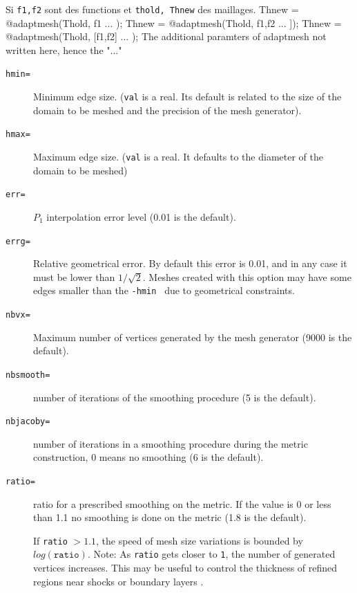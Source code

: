 \documentclass[a4paper,twoside,12pt]{book}
\begin{document}
Si \texttt{f1,f2} sont des functions  et \texttt{thold, Thnew} des maillages.
\bFF
    Thnew = @adaptmesh(Thold, f1  ...  );
    Thnew = @adaptmesh(Thold, f1,f2  ...  ]);
    Thnew = @adaptmesh(Thold, [f1,f2]  ...  );
\eFF
The additional paramters of  adaptmesh not written here, hence the  "..."
\begin{description}

\item[\texttt{hmin=}] Minimum edge size.   ({\tt val} is a real. Its default is related to the
size of the domain to be meshed and the precision of the mesh generator).

\item[\texttt{hmax=}] Maximum edge size.  ({\tt val} is a real.  It defaults to the diameter of the domain to be meshed)

\item[\texttt{err=}] $P_1$ interpolation error level (0.01 is the default).  

\item[\texttt{errg=}] Relative geometrical error. By default this error is 0.01, and in any case it must be lower than
$1/\sqrt{2}$.  Meshes created with this option may have some edges smaller than the {\tt -hmin } due to geometrical
constraints.  

\item[\texttt{nbvx=}] Maximum number of vertices generated by the mesh generator (9000 is the default).

\item[\texttt{nbsmooth=}] number of iterations of the smoothing procedure (5 is the default).

\item[\texttt{nbjacoby=}] number of iterations in a smoothing procedure during the metric construction, 0 means no
smoothing (6 is the default).  

\item[\texttt{ratio=}] ratio for a prescribed smoothing on the metric.  If the value is 0 or less than 1.1 no smoothing
is done on the metric (1.8 is the default).

If \texttt{ratio} $> 1.1$, the speed of mesh size variations is bounded by $log(\mathtt{ratio})$.  Note: As {\tt ratio}
gets closer to {\tt 1}, the number of generated vertices increases.  This may be useful to control the thickness of
refined regions near shocks or boundary layers .  


\end{description}
\end{document}
